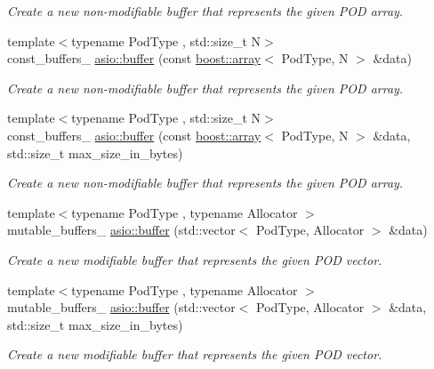 \begin{DoxyCompactItemize}
\begin{DoxyCompactList}\small\item\em Create a new non-\/modifiable buffer that represents the given P\+O\+D array. \end{DoxyCompactList}\item 
{\footnotesize template$<$typename Pod\+Type , std\+::size\+\_\+t N$>$ }\\const\+\_\+buffers\+\_ \hyperlink{group__buffer_gacee4fc886d2abc070fbabc77ebeb508d}{asio\+::buffer} (const \hyperlink{classboost_1_1array}{boost\+::array}$<$ Pod\+Type, N $>$ \&data)
\begin{DoxyCompactList}\small\item\em Create a new non-\/modifiable buffer that represents the given P\+O\+D array. \end{DoxyCompactList}\item 
{\footnotesize template$<$typename Pod\+Type , std\+::size\+\_\+t N$>$ }\\const\+\_\+buffers\+\_ \hyperlink{group__buffer_gac7e496b244e3999f2035c29043cd2ff9}{asio\+::buffer} (const \hyperlink{classboost_1_1array}{boost\+::array}$<$ Pod\+Type, N $>$ \&data, std\+::size\+\_\+t max\+\_\+size\+\_\+in\+\_\+bytes)
\begin{DoxyCompactList}\small\item\em Create a new non-\/modifiable buffer that represents the given P\+O\+D array. \end{DoxyCompactList}\item 
{\footnotesize template$<$typename Pod\+Type , typename Allocator $>$ }\\mutable\+\_\+buffers\+\_ \hyperlink{group__buffer_ga382ee4d2d0dd90e88e374e4344302749}{asio\+::buffer} (std\+::vector$<$ Pod\+Type, Allocator $>$ \&data)
\begin{DoxyCompactList}\small\item\em Create a new modifiable buffer that represents the given P\+O\+D vector. \end{DoxyCompactList}\item 
{\footnotesize template$<$typename Pod\+Type , typename Allocator $>$ }\\mutable\+\_\+buffers\+\_ \hyperlink{group__buffer_gad0a0b6813e25e7bcce7fcfe32a5cdab9}{asio\+::buffer} (std\+::vector$<$ Pod\+Type, Allocator $>$ \&data, std\+::size\+\_\+t max\+\_\+size\+\_\+in\+\_\+bytes)
\begin{DoxyCompactList}\small\item\em Create a new modifiable buffer that represents the given P\+O\+D vector. \end{DoxyCompactList}\item 

\end{DoxyCompactItemize}
